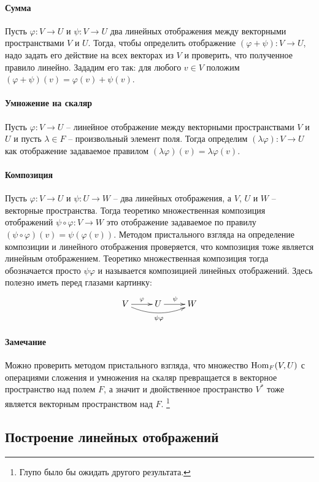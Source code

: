 \paragraph{Сумма} Пусть $\varphi\colon V\to U$ и $\psi \colon V\to U$ два линейных отображения между векторными пространствами $V$ и $U$.
Тогда, чтобы определить отображение $(\varphi+\psi)\colon V\to U$, надо задать его действие на всех векторах из $V$ и проверить, что полученное правило линейно.
Зададим его так: для любого $v\in V$ положим $(\varphi + \psi)(v) = \varphi(v) + \psi(v)$.

\paragraph{Умножение на скаляр} Пусть $\varphi\colon V\to U$ -- линейное отображение между векторными пространствами $V$ и $U$ и пусть $\lambda \in F$ -- произвольный элемент поля.
Тогда определим $(\lambda \varphi)\colon V\to U$ как отображение задаваемое правилом $(\lambda\varphi)(v) = \lambda \varphi(v)$.

\paragraph{Композиция} Пусть $\varphi\colon V\to U$ и $\psi \colon U \to W$ -- два линейных отображения, а $V$, $U$ и $W$ -- векторные пространства.
Тогда теоретико множественная композиция отображений $\psi\circ \varphi\colon V\to W$ это отображение задаваемое по правилу $(\psi\circ \varphi)(v) = \psi(\varphi(v))$.
Методом пристального взгляда на определение композиции и линейного отображения проверяется, что композиция тоже является линейным отображением.
Теоретико множественная композиция тогда обозначается просто $\psi\varphi$ и называется композицией линейных отображений.
Здесь полезно иметь перед глазами картинку:
\[
\xymatrix{
  {V}\ar[r]^{\varphi}\ar@/_10pt/[rr]_{\psi\varphi}&{U}\ar[r]^{\psi}&{W}
}
\]

\paragraph{Замечание} Можно проверить методом пристального взгляда, что множество $\operatorname{Hom}_F(V,U)$ с операциями сложения и умножения на скаляр превращается в векторное пространство над полем $F$, а значит и двойственное пространство $V^*$ тоже является векторным пространством над $F$.%
\footnote{Глупо было бы ожидать другого результата.}

\subsection{Построение линейных отображений}

